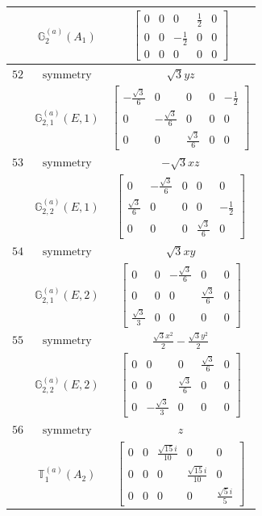 \documentclass[fleqn,8pt,landscape]{jsarticle}
\begin{document}
\begin{longtable}{ccc}
$  $ & $ \mathbb{G}_{2}^{(a)}(A_{1}) $ & $ \begin{bmatrix} 0 & 0 & 0 & \frac{1}{2} & 0 \\ 0 & 0 & - \frac{1}{2} & 0 & 0 \\ 0 & 0 & 0 & 0 & 0 \end{bmatrix} $ \\ \hline
$ 52 $ & $ \text{symmetry} $ & $ \sqrt{3} y z $ \\
$  $ & $ \mathbb{G}_{2,1}^{(a)}(E,1) $ & $ \begin{bmatrix} - \frac{\sqrt{3}}{6} & 0 & 0 & 0 & - \frac{1}{2} \\ 0 & - \frac{\sqrt{3}}{6} & 0 & 0 & 0 \\ 0 & 0 & \frac{\sqrt{3}}{6} & 0 & 0 \end{bmatrix} $ \\ \hline
$ 53 $ & $ \text{symmetry} $ & $ - \sqrt{3} x z $ \\
$  $ & $ \mathbb{G}_{2,2}^{(a)}(E,1) $ & $ \begin{bmatrix} 0 & - \frac{\sqrt{3}}{6} & 0 & 0 & 0 \\ \frac{\sqrt{3}}{6} & 0 & 0 & 0 & - \frac{1}{2} \\ 0 & 0 & 0 & \frac{\sqrt{3}}{6} & 0 \end{bmatrix} $ \\ \hline
$ 54 $ & $ \text{symmetry} $ & $ \sqrt{3} x y $ \\
$  $ & $ \mathbb{G}_{2,1}^{(a)}(E,2) $ & $ \begin{bmatrix} 0 & 0 & - \frac{\sqrt{3}}{6} & 0 & 0 \\ 0 & 0 & 0 & \frac{\sqrt{3}}{6} & 0 \\ \frac{\sqrt{3}}{3} & 0 & 0 & 0 & 0 \end{bmatrix} $ \\ \hline
$ 55 $ & $ \text{symmetry} $ & $ \frac{\sqrt{3} x^{2}}{2} - \frac{\sqrt{3} y^{2}}{2} $ \\
$  $ & $ \mathbb{G}_{2,2}^{(a)}(E,2) $ & $ \begin{bmatrix} 0 & 0 & 0 & \frac{\sqrt{3}}{6} & 0 \\ 0 & 0 & \frac{\sqrt{3}}{6} & 0 & 0 \\ 0 & - \frac{\sqrt{3}}{3} & 0 & 0 & 0 \end{bmatrix} $ \\ \hline
$ 56 $ & $ \text{symmetry} $ & $ z $ \\
$  $ & $ \mathbb{T}_{1}^{(a)}(A_{2}) $ & $ \begin{bmatrix} 0 & 0 & \frac{\sqrt{15} i}{10} & 0 & 0 \\ 0 & 0 & 0 & \frac{\sqrt{15} i}{10} & 0 \\ 0 & 0 & 0 & 0 & \frac{\sqrt{5} i}{5} \end{bmatrix} $ \\ \hline

\end{longtable}
\end{document}
